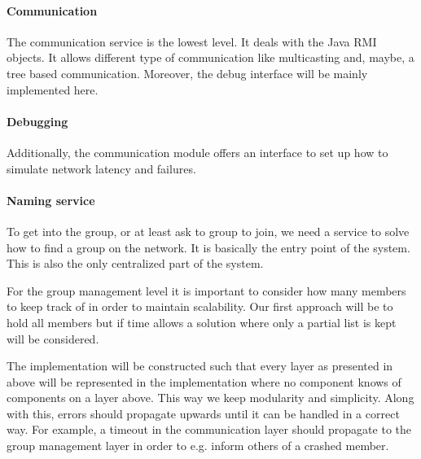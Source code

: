 \paragraph{Communication}{
	The communication service is the lowest level. It deals
 with the Java RMI objects. It allows different type of
 communication like multicasting and, maybe, a tree based
 communication.  \newline
 Moreover, the debug interface will be mainly implemented here.
}

\paragraph{Debugging}{
	Additionally, the communication module offers an interface
 to set up how to simulate network latency and failures.
}

\paragraph{Naming service}{
	To get into the group, or at least ask to group to join,
 we need a service to solve how to find a group on the network.
 It is basically the entry point of the system.
 This is also the only centralized part of the system.
}

	For the group management level it is important to consider
 how many members to keep track of in order to maintain
 scalability. Our first approach will be to hold all members
 but if time allows a solution where only a partial list is kept
 will be considered.

The implementation will be constructed such that every layer
as presented in above will be represented in the implementation
where no component knows of components on a layer above.
This way we keep modularity and simplicity.
Along with this, errors should propagate upwards until it can
be handled in a correct way. For example, a timeout in the 
communication layer should propagate to the group management layer
in order to e.g. inform others of a crashed member.
